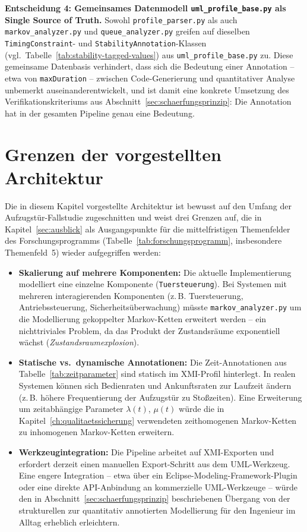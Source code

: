 ﻿\documentclass[a4paper,12pt]{report}
\theoremstyle{definition}
\begin{document}
\textbf{Entscheidung 4: Gemeinsames Datenmodell \texttt{uml\_profile\_base.py}
als Single Source of Truth.} Sowohl \texttt{profile\_parser.py} als auch
\texttt{markov\_analyzer.py} und \texttt{queue\_analyzer.py} greifen auf
dieselben \texttt{TimingConstraint}- und \texttt{StabilityAnnotation}-Klassen
(vgl.\ Tabelle~\ref{tab:stability-tagged-values}) aus
\texttt{uml\_profile\_base.py} zu. Diese gemeinsame Datenbasis verhindert,
dass sich die Bedeutung einer Annotation -- etwa von \texttt{maxDuration} --
zwischen Code-Generierung und quantitativer Analyse unbemerkt
auseinanderentwickelt, und ist damit eine konkrete Umsetzung des
Verifikationskriteriums aus Abschnitt~\ref{sec:schaerfungsprinzip}: Die
Annotation hat in der gesamten Pipeline genau eine Bedeutung.

\section{Grenzen der vorgestellten Architektur}
\label{sec:architektur-grenzen}

Die in diesem Kapitel vorgestellte Architektur ist bewusst auf den Umfang
der Aufzugstür-Fallstudie zugeschnitten und weist drei Grenzen auf, die in
Kapitel~\ref{sec:ausblick} als Ausgangspunkte für die mittelfristigen
Themenfelder des Forschungsprogramms (Tabelle~\ref{tab:forschungsprogramm},
insbesondere Themenfeld~5) wieder aufgegriffen werden:

\begin{itemize}
  \item \textbf{Skalierung auf mehrere Komponenten:} Die aktuelle
  Implementierung modelliert eine einzelne Komponente
  (\texttt{Tuersteuerung}). Bei Systemen mit mehreren interagierenden
  Komponenten (z.\,B. Tuersteuerung, Antriebssteuerung,
  Sicherheitsüberwachung) müsste \texttt{markov\_analyzer.py} um die
  Modellierung gekoppelter Markov-Ketten erweitert werden -- ein
  nichttriviales Problem, da das Produkt der Zustandsräume exponentiell
  wächst (\emph{Zustandsraumexplosion}).

  \item \textbf{Statische vs.\ dynamische Annotationen:} Die
  Zeit-Annotationen aus Tabelle~\ref{tab:zeitparameter} sind statisch im
  XMI-Profil hinterlegt. In realen Systemen können sich Bedienraten und
  Ankunftsraten zur Laufzeit ändern (z.\,B. höhere Frequentierung der
  Aufzugstür zu Stoßzeiten). Eine Erweiterung um zeitabhängige Parameter
  $\lambda(t)$, $\mu(t)$ würde die in Kapitel~\ref{ch:qualitaetssicherung}
  verwendeten zeithomogenen Markov-Ketten zu inhomogenen Markov-Ketten
  erweitern.

  \item \textbf{Werkzeugintegration:} Die Pipeline arbeitet auf
  XMI-Exporten und erfordert derzeit einen manuellen Export-Schritt aus dem
  UML-Werkzeug. Eine engere Integration -- etwa über ein
  Eclipse-Modeling-Framework-Plugin oder eine direkte API-Anbindung an
  kommerzielle UML-Werkzeuge -- würde den in
  Abschnitt~\ref{sec:schaerfungsprinzip} beschriebenen Übergang von der
  strukturellen zur quantitativ annotierten Modellierung für den Ingenieur
  im Alltag erheblich erleichtern.
\end{itemize}
\end{document}
